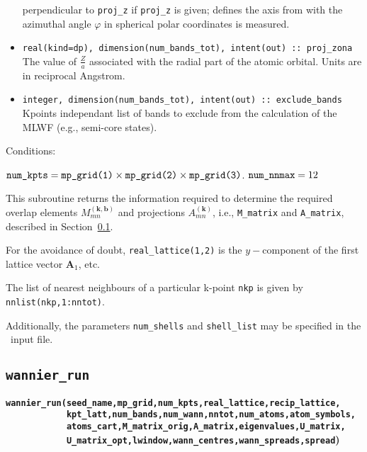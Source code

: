 \begin{itemize}
perpendicular to \verb#proj_z# if \verb#proj_z# is given; defines the
axis from with the azimuthal angle $\varphi$ in spherical polar
coordinates is measured.
\item \verb#real(kind=dp), dimension(num_bands_tot), intent(out) :: proj_zona#\\
The value of $\frac{Z}{a}$ associated
with the radial part of the atomic orbital. Units are in reciprocal
Angstrom.
\item \verb#integer, dimension(num_bands_tot), intent(out) :: exclude_bands#\\ 
      Kpoints independant list of bands to exclude from the
      calculation of the MLWF (e.g., semi-core states). 

\end{itemize}

Conditions:
\begin{itemize}
\cond $\verb#num_kpts# = \verb#mp_grid(1)# \times \verb#mp_grid(2)#
\times \verb#mp_grid(3)#$.
\cond $\verb#num_nnmax# = 12$
\end{itemize}

This subroutine returns the information required to determine the
required overlap elements $M_{mn}^{(\mathbf{k,b})}$ and
projections $A_{mn}^{(\mathbf{k})}$,
i.e., \verb#M_matrix# and \verb#A_matrix#, described in
Section~\ref{wannier_run}. 

For the avoidance of doubt, \verb#real_lattice(1,2)# is the
$y-$component of the first lattice vector $\mathbf{A}_{1}$, etc.

The list of nearest neighbours of a particular k-point \verb#nkp# is
given by \verb#nnlist(nkp,1:nntot)#.

Additionally, the parameters \verb#num_shells# and \verb#shell_list#
may be specified in the \wannier\ input file.

\subsection{{\tt wannier\_run}} \label{wannier_run}

{\noindent \bf \verb#wannier_run(seed_name,mp_grid,num_kpts,real_lattice,recip_lattice,#\\
\verb#            kpt_latt,num_bands,num_wann,nntot,num_atoms,atom_symbols,#\\
\verb#            atoms_cart,M_matrix_orig,A_matrix,eigenvalues,U_matrix,#\\
\verb#            U_matrix_opt,lwindow,wann_centres,wann_spreads,spread#)}

